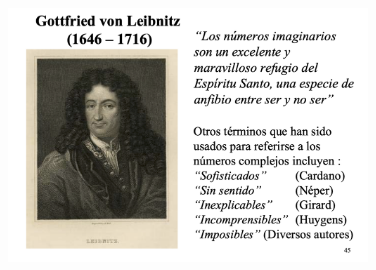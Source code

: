 \begin{figure}[H]
	\centering
	\includegraphics[width=0.85\textwidth]{img-c/comp06.png}
\end{figure}

